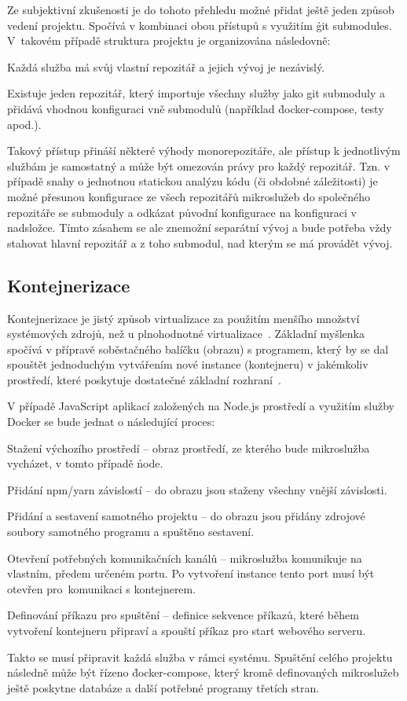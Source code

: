 Ze subjektivní zkušenosti je do tohoto přehledu možné přidat ještě jeden způsob vedení projektu.
Spočívá v kombinaci obou přístupů s využitím \h{git submodules}.
V~takovém případě struktura projektu je organizována následovně:

\begin{ul}
   \item Každá služba má svůj vlastní repozitář a jejich vývoj je nezávislý.
   \item Existuje jeden repozitář, který importuje všechny služby jako git submoduly a přidává vhodnou konfiguraci vně submodulů (například \h{docker-compose}, testy apod.).
\end{ul}

Takový přístup přináší některé výhody monorepozitáře, ale přístup k jednotlivým službám je samostatný a může být omezován právy pro každý repozitář.
Tzn.
v případě snahy o jednotnou statickou analýzu kódu (či obdobné záležitosti) je možné přesunou konfigurace ze všech repozitářů mikroslužeb do společného repozitáře se submoduly a odkázat původní konfigurace na konfiguraci v nadsložce.
Tímto zásahem se ale znemožní separátní vývoj a bude potřeba vždy stahovat hlavní repozitář a z toho submodul, nad kterým se má provádět vývoj.



\subsection{Kontejnerizace}\label{subsec:msa-deployment-containerization}
Kontejnerizace je jistý způsob virtualizace za použitím menšího množství systémových zdrojů, než u plnohodnotné virtualizace~\cite{kontejnerizace}.
Základní myšlenka spočívá v přípravě soběstačného balíčku (obrazu) s programem, který by se dal spouštět jednoduchým vytvářením nové instance (kontejneru) v jakémkoliv prostředí, které poskytuje dostatečné základní rozhraní~\cite{dockercontainer}.

V případě JavaScript aplikací založených na Node.js prostředí a využitím služby Docker se bude jednat o následující proces:

\begin{dl}
   \item [Stažení výchozího prostředí] – obraz prostředí, ze kterého bude mikroslužba vycházet, v tomto případě \h{node}.
   \item [Přidání npm/yarn závislostí] – do obrazu jsou staženy všechny vnější závislosti.
   \item [Přidání a sestavení samotného projektu] – do obrazu jsou přidány zdrojové soubory samotného programu a spuštěno sestavení.
   \item [Otevření potřebných komunikačních kanálů] – mikroslužba komunikuje na vlastním, předem určeném portu.
   Po vytvoření instance tento port musí být otevřen pro~komunikaci s kontejnerem.
   \item [Definování příkazu pro spuštění] – definice sekvence příkazů, které během vytvoření kontejneru připraví a spouští příkaz pro start webového serveru.
\end{dl}

Takto se musí připravit každá služba v rámci systému.
Spuštění celého projektu následně může být řízeno \h{docker-compose}, který kromě definovaných mikroslužeb ještě poskytne databáze a další potřebné programy třetích stran.
